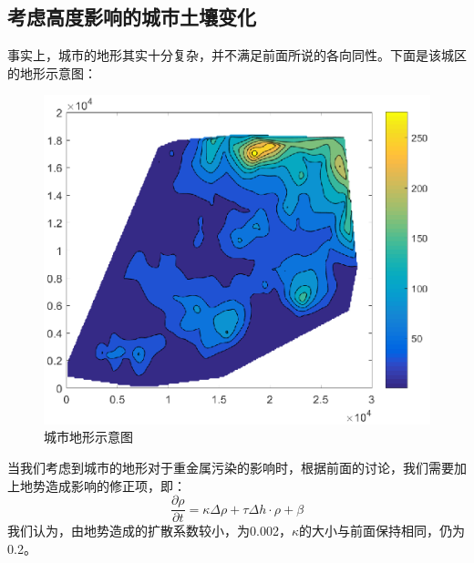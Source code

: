 \documentclass[a4paper]{article}
\begin{document}
\subsection{考虑高度影响的城市土壤变化}
事实上，城市的地形其实十分复杂，并不满足前面所说的各向同性。下面是该城区的地形示意图：
\begin{figure}[H]
    \centerline{
    \includegraphics[scale=0.8]{pictures/height.eps}}
    \caption{城市地形示意图}
    \label{fig:height}
\end{figure}
当我们考虑到城市的地形对于重金属污染的影响时，根据前面的讨论，我们需要加上地势造成影响的修正项，即：
\begin{equation}
 \frac{\partial \rho}{\partial t}=\kappa  \Delta \rho  + \tau \Delta h \cdot \rho + \beta
\end{equation}
我们认为，由地势造成的扩散系数较小，为0.002，$\kappa$的大小与前面保持相同，仍为0.2。
\end{document}
